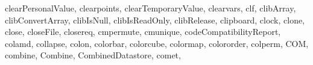 {{        clearPersonalValue,%
        clearpoints,%
        clearTemporaryValue,%
        clearvars,%
        clf,%
        clibArray,%
        clibConvertArray,%
        clibIsNull,%
        clibIsReadOnly,%
        clibRelease,%
        clipboard,%
        clock,%
        clone,%
        close,%
        closeFile,%
        closereq,%
        cmpermute,%
        cmunique,%
        codeCompatibilityReport,%
        colamd,%
        collapse,%
        colon,%
        colorbar,%
        colorcube,%
        colormap,%
        colororder,%
        colperm,%
        COM,%
        combine,%
        Combine,%
        CombinedDatastore,%
        comet,%
}}
